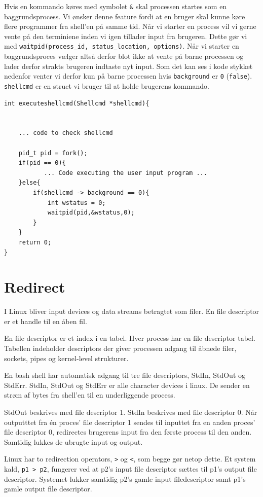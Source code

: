 \documentclass[danish]{report}
\begin{document}
Hvis en kommando køres med symbolet {\tt \&} skal processen startes som en baggrundsprocess. Vi ønsker denne feature fordi at en bruger skal kunne køre flere programmer fra shell'en på samme tid. Når vi starter en process vil vi gerne vente på den terminiene inden vi igen tillader input fra brugeren. Dette gør vi med {\tt waitpid(process\_id, status\_location, options)}. Når vi starter en baggrundsproces vælger altså derfor blot ikke at vente på barne processen og lader derfor strakts brugeren indtaste nyt input. Som det kan ses i kode stykket nedenfor venter vi derfor kun på barne processen hvis {\tt background} er {\tt 0} ({\tt false}). {\tt shellcmd} er en struct vi bruger til at holde brugerens kommando. 
\begin{lstlisting}
int executeshellcmd(Shellcmd *shellcmd){
    

    ... code to check shellcmd

    pid_t pid = fork();
    if(pid == 0){
           ... Code executing the user input program ...
    }else{
        if(shellcmd -> background == 0){
            int wstatus = 0;    
            waitpid(pid,&wstatus,0);
        }
    }
    return 0;
}
\end{lstlisting}

\section{Redirect}
\label{redirect}
I Linux bliver input devices og data streams betragtet som filer. En file descriptor er et handle til en åben fil.

En file descriptor er et index i en tabel. Hver process har en file descriptor tabel. Tabellen indeholder descriptors der giver processen adgang til åbnede filer, sockets, pipes og kernel-level strukturer.   

En bash shell har automatisk adgang til tre file descriptors, StdIn, StdOut og StdErr. StdIn, StdOut og StdErr er alle character devices i linux. De sender en strøm af bytes fra shell'en til en underliggende process.  

StdOut  beskrives med file descriptor 1. StdIn beskrives med file descriptor 0. Når outputttet fra én proces' file descriptor 1 sendes til inputtet fra en anden proces' file descriptor 0, redirectes brugerens input fra den første process til den anden. Samtidig lukkes de ubrugte input og output.   

Linux har to redirection operators, {\tt >} og {\tt <}, som begge gør netop dette. Et system kald, {\tt p1 > p2}, fungerer ved at p2's input file descriptor sættes til p1's output file descriptor. Systemet lukker samtidig p2's gamle input filedescriptor samt p1's gamle output file descriptor. 
\end{document}

